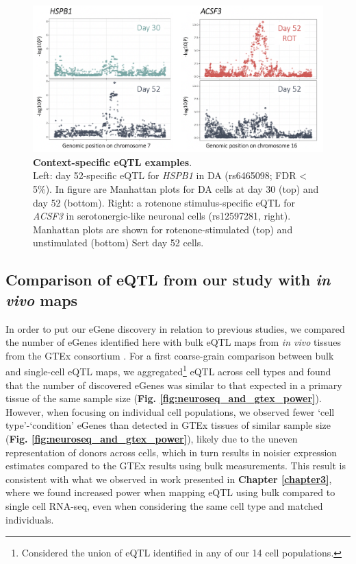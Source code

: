 \begin{figure}[h]
\includegraphics[width=16cm]{Chapter5/Fig/neuroseq_eqtl_examples.png}
\caption[Context-specific eQTL examples]{\textbf{Context-specific eQTL examples}.\\
Left: day 52-specific eQTL for \textit{HSPB1} in DA (rs6465098; FDR < 5\%). 
In figure are Manhattan plots for DA cells at day 30 (top) and day 52 (bottom). 
Right: a rotenone stimulus-specific eQTL for \textit{ACSF3} in serotonergic-like neuronal cells (rs12597281, right). 
Manhattan plots are shown for rotenone-stimulated (top) and unstimulated (bottom) Sert day 52 cells.}
\label{fig:neuroseq_eqtl_examples}
\end{figure}

\clearpage

\subsection{Comparison of eQTL from our study with \textit{in vivo} maps}

In order to put our eGene discovery in relation to previous studies, we compared the number of eGenes identified here with bulk eQTL maps from \textit{in vivo} tissues from the GTEx consortium \cite{gtex2017genetic}. 
For a first coarse-grain comparison between bulk and single-cell eQTL maps,
we aggregated\footnote{Considered the union of eQTL identified in any of our 14 cell populations.} eQTL across cell types and found that the number of discovered eGenes was similar to that expected in a primary tissue of the same sample size (\textbf{Fig. \ref{fig:neuroseq_and_gtex_power}}). \\

However, when focusing on individual cell populations, we observed fewer `cell type'-`condition' eGenes than detected in GTEx tissues of similar sample size (\textbf{Fig. \ref{fig:neuroseq_and_gtex_power}}), likely due to the uneven representation of donors across cells, which in turn results in noisier expression estimates compared to the GTEx results using bulk measurements.
This result is consistent with what we observed in work presented in \textbf{Chapter \ref{chapter3}}, where we found increased power when mapping eQTL using bulk compared to single cell RNA-seq, even when considering the same cell type and matched individuals. 

